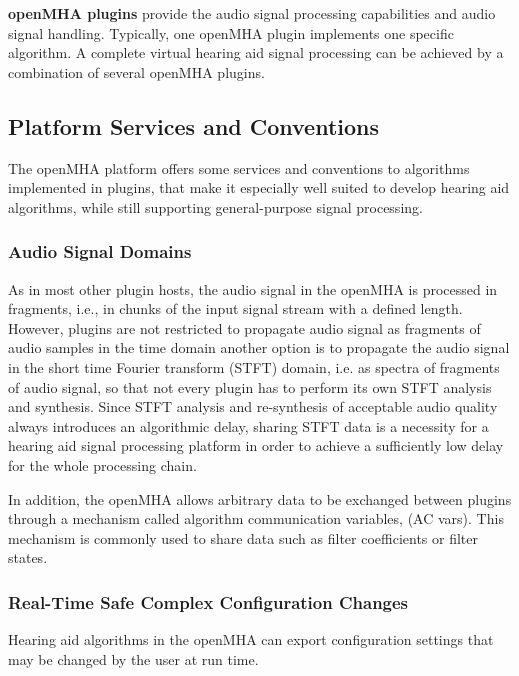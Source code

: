 {\bf openMHA plugins} provide the audio signal processing capabilities and audio signal handling. Typically, one openMHA plugin implements one specific algorithm. A complete virtual hearing aid signal processing can be achieved by a combination of several openMHA plugins.\subsection{Platform Services and Conventions}\label{index_pltf}
The openMHA platform offers some services and conventions to algorithms implemented in plugins, that make it especially well suited to develop hearing aid algorithms, while still supporting general-\/purpose signal processing.\subsubsection{Audio Signal Domains}\label{index_asd}
As in most other plugin hosts, the audio signal in the openMHA is processed in fragments, i.e., in chunks of the input signal stream with a defined length. However, plugins are not restricted to propagate audio signal as fragments of audio samples in the time domain another option is to propagate the audio signal in the short time Fourier transform (STFT) domain, i.e. as spectra of fragments of audio signal, so that not every plugin has to perform its own STFT analysis and synthesis. Since STFT analysis and re-\/synthesis of acceptable audio quality always introduces an algorithmic delay, sharing STFT data is a necessity for a hearing aid signal processing platform in order to achieve a sufficiently low delay for the whole processing chain.

In addition, the openMHA allows arbitrary data to be exchanged between plugins through a mechanism called algorithm communication variables, (AC vars). This mechanism is commonly used to share data such as filter coefficients or filter states.\subsubsection{Real-\/Time Safe Complex Configuration Changes}\label{index_rtscc}
Hearing aid algorithms in the openMHA can export configuration settings that may be changed by the user at run time.

